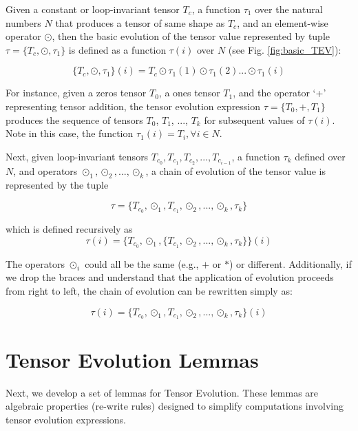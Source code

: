 \documentclass{article}
\begin{document}
Given a constant or loop-invariant tensor $T_c$,  a function $\tau_1$ over the natural
numbers $N$ that produces a tensor of same shape as $T_c$, and an element-wise operator
$\odot$, then the basic evolution of the tensor value represented by tuple
$\tau=\{T_c, \odot, \tau_1\}$ is defined as a function $\tau(i)$ over $N$
(see Fig. \ref{fig:basic_TEV}):
    
\begin{equation}
\{T_c, \odot, \tau_1\}(i) = T_c \odot \tau_1(1) \odot \tau_1(2) ... \odot \tau_1(i)
\end{equation}
    
    For instance, given a zeros tensor $T_0$, a ones tensor $T_1$, and the operator `+'
     representing tensor addition, the tensor evolution expression $\tau=\{T_0, +, T_1\}$
      produces the sequence of tensors $T_0$, $T_1$, ..., $T_k$ for subsequent values
       of $\tau(i)$. Note in this case, the function $\tau_1(i) = T_i, \forall i \in N$.
    
    Next, given loop-invariant tensors $T_{c_0}, T_{c_1}, T_{c_2}, ...,T_{c_{i-1}}$,
     a function $\tau_k$ defined over $N$, and operators $\odot_{1}, \odot_{2}, ..., \odot_k$,
      a chain of evolution of the tensor value is represented by the tuple 
    
    \begin{equation}
    \tau = \{T_{c_0}, \odot_{1},T_{c_1}, \odot_{2}, ..., \odot_{k}, \tau_{k} \}    
    \end{equation}
    
    which is defined recursively as 
    \begin{equation}
    \tau(i) = \{T_{c_0}, \odot_{1}, \{T_{c_1}, \odot_{2}, ..., \odot_{k}, \tau_{k} \} \}(i)
    \end{equation}
    
    The operators $\odot_{i}$ could all be the same (e.g., $+$ or $*$) or different. Additionally,
     if we drop the braces and understand that the application of evolution proceeds 
     from right to left, the chain of evolution can be rewritten simply as: 
    
    \begin{equation}
    \tau(i) = \{T_{c_0}, \odot_{1}, T_{c_1}, \odot_{2}, ..., \odot_{k}, \tau_{k} \}(i)
    \end{equation}
    
    \section{Tensor Evolution Lemmas}
    Next, we develop a set of lemmas for Tensor Evolution. These lemmas are algebraic 
    properties (re-write rules) designed to simplify computations involving tensor evolution expressions.
    
\end{document}
